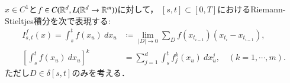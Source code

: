 \begin{screen}
	\begin{dfn}[$C^1$-級のパスに対する汎関数]
		$x \in C^1$と$f \in C(\mathbb{R}^d,L(\mathbb{R}^d \rightarrow \mathbb{R}^m))$に対して，
		$[s,t] \subset [0,T]$におけるRiemann-Stieltjes積分を次で表現する:
		\begin{align}
			I^f_{s,t}(x) = \int_s^t f(x_u)\ dx_u 
			&\coloneqq \lim_{|D| \to 0}
				\sum_{D} f(x_{t_{i-1}})(x_{t_i} - x_{t_{i-1}}), \\
			\left[ \int_s^t f(x_u)\ dx_u \right]^k
			&= \sum_{j=1}^d \int_s^t f^k_j(x_u)\ dx^j_u,
			\quad (k = 1,\cdots,m).
		\end{align}
		ただし$D \in \delta[s,t]$のみを考える．
	\end{dfn}
\end{screen}

\begin{comment}
\begin{screen}
	\begin{thm}[$I$の加法性・線型性・絶対値]
	\label{thm:linearity_of_Riemann_Stieltjes_integral}
		任意の$x \in C^1,\ f,g \in C(\R^d,L(\R^d \rightarrow \R^m)),\ \alpha,\beta \in \R$に対して次が成立する:
		\begin{description}
			\item[(1)] $I^f_{s,u}(x) + I^f_{u,t}(x) = I^f_{s,t}(x)$,
			
			\item[(2)] $I^{(\alpha f + \beta g)}_{s,t}(x) = \alpha I^f_{s,t}(x) + \beta I^g_{s,t}(x)$.
			
			\item[(3)] $\left| I^f_{s,t}(x) \right| \leq \int_s^t |f(x_u)| |\dot{x}_u|\ du$.
		\end{description}
	\end{thm}
\end{screen}


\end{comment}
